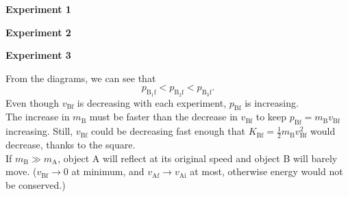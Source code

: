 \documentclass[]{article}
\begin{document}
\begin{TeacherMargin}
\begin{multicols}{2}
\newcommand{\ExpMVD}[1]{
\MVDRows{EO}
\MVDCol{AO}{A$_{#1}$}{EO}
\MVec{AOinit}{0.75}
\MVDCol{BO}{B$_{#1}$}{AO}
\MDot{BOinit}
\MVDCol{SO}{A$_{#1}$ \& B$_{#1}$}{BO}
\MVec{SOinit}{0.75}
\MDot{SOdelt}
\MVec{SOfin}{0.75}
}
\newcommand{\Quart}[2]{
\begin{scope}[violet]
	\MVec[180]{AOfin}{#1}
\end{scope}
\begin{scope}[blue]
	\MVec[180]{AOdelt}{#2}
	\MVec{BOdelt}{#2}
	\MVec{BOfin}{#2}
\end{scope}
}
\noindent\textbf{Experiment 1}
\begin{center}
\end{center}
\textbf{Experiment 2}
\begin{center}
\end{center}
\textbf{Experiment 3}
\begin{center}
\end{center}
\vspace{7cm}
From the diagrams, we can see that
\[
p_{\text{B}_{1}\text{f}} < p_{\text{B}_{2}\text{f}} < p_{\text{B}_{3}\text{f}}.
\]
Even though $v_{\text{Bf}}$ is decreasing with each experiment, $p_{\text{Bf}}$ is increasing. \\

\noindent The increase in $m_{\text{B}}$ must be faster than the decrease in $v_{\text{Bf}}$ to keep $p_{\text{Bf}}=m_{\text{B}}v_{\text{Bf}}$ increasing. Still, $v_{\text{Bf}}$ could be decreasing fast enough that $K_{\text{Bf}} = \frac{1}{2}m_{\text{B}}v_{\text{Bf}}^{2}$ would decrease, thanks to the square. \\

\noindent If $m_{\text{B}} \gg m_{\text{A}}$, object A will reflect at its original speed and object B will barely move. ($v_{\text{Bf}}\to0$ at minimum, and $v_{\text{Af}}\to v_{\text{Ai}}$ at most, otherwise energy would not be conserved.)
\end{multicols}
\end{TeacherMargin}
\end{document}
